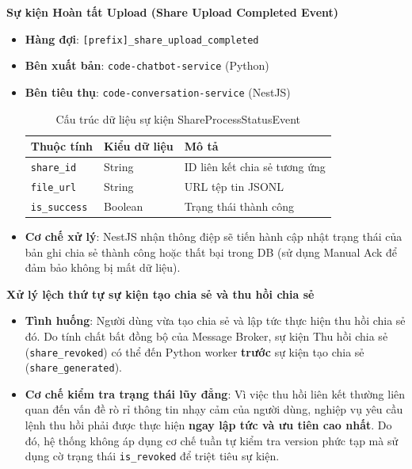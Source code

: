 \textbf{Sự kiện Hoàn tất Upload (Share Upload Completed Event)}
\begin{itemize}
\item \textbf{Hàng đợi}: \texttt{[prefix]\_share\_upload\_completed}
\item \textbf{Bên xuất bản}: \texttt{code-chatbot-service} (Python)
\item \textbf{Bên tiêu thụ}: \texttt{code-conversation-service} (NestJS)

\begin{table}[H]
\centering
\begin{tabular}{|l|l|l|}
\hline
\textbf{Thuộc tính} & \textbf{Kiểu dữ liệu} & \textbf{Mô tả} \\ \hline
\texttt{share\_id} & String & ID liên kết chia sẻ tương ứng \\ \hline
\texttt{file\_url} & String & URL tệp tin JSONL \\ \hline
\texttt{is\_success} & Boolean & Trạng thái thành công \\ \hline
\end{tabular}
\caption{Cấu trúc dữ liệu sự kiện ShareProcessStatusEvent}
\end{table}

\item \textbf{Cơ chế xử lý}: NestJS nhận thông điệp sẽ tiến hành cập nhật trạng thái của bản ghi chia sẻ thành công hoặc thất bại trong DB (sử dụng Manual Ack để đảm bảo không bị mất dữ liệu).
\end{itemize}

\textbf{Xử lý lệch thứ tự sự kiện tạo chia sẻ và thu hồi chia sẻ}
\begin{itemize}
\item \textbf{Tình huống}: Người dùng vừa tạo chia sẻ và lập tức thực hiện thu hồi chia sẻ đó.
Do tính chất bất đồng bộ của Message Broker,
sự kiện Thu hồi chia sẻ (\texttt{share\_revoked})
có thể đến Python worker \textbf{trước} sự kiện tạo chia sẻ
(\texttt{share\_generated}).
\item \textbf{Cơ chế kiểm tra trạng thái lũy đẳng}:
Vì việc thu hồi liên kết thường liên quan đến vấn đề
rò rỉ thông tin nhạy cảm của người dùng,
nghiệp vụ yêu cầu lệnh thu hồi
phải được thực hiện
\textbf{ngay lập tức và ưu tiên cao nhất}.
Do đó, hệ thống không áp dụng cơ chế tuần tự
kiểm tra version phức tạp mà
sử dụng cờ trạng thái \texttt{is\_revoked}
để triệt tiêu sự kiện.
\end{itemize}

